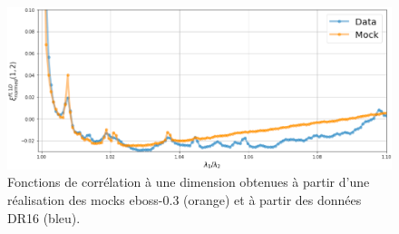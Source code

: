 \begin{figure}
  \centering
  \includegraphics[scale=0.45]{cf1d_eboss03}
  \caption{Fonctions de corrélation à une dimension obtenues à partir d'une réalisation des mocks eboss-0.3 (orange) et à partir des données DR16 (bleu).}
  \label{fig:cf1d_eboss03}
\end{figure}



% 
% 
